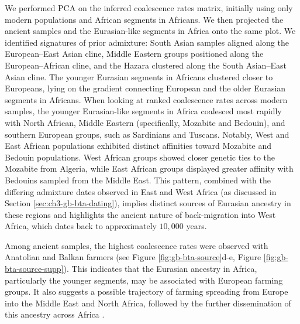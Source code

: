 
We performed PCA on the inferred coalescence rates matrix, initially using only modern populations and African segments in Africans. We then projected the ancient samples and the Eurasian-like segments in Africa onto the same plot. We identified signatures of prior admixture: South Asian samples aligned along the European–East Asian cline, Middle Eastern groups positioned along the European–African cline, and the Hazara clustered along the South Asian–East Asian cline. The younger Eurasian segments in Africans clustered closer to Europeans, lying on the gradient connecting European and the older Eurasian segments in Africans. When looking at ranked coalescence rates across modern samples, the younger Eurasian-like segments in Africa coalesced most rapidly with North African, Middle Eastern (specifically, Mozabite and Bedouin), and southern European groups, such as Sardinians and Tuscans. Notably, West and East African populations exhibited distinct affinities toward Mozabite and Bedouin populations. West African groups showed closer genetic ties to the Mozabite from Algeria, while East African groups displayed greater affinity with Bedouins sampled from the Middle East. This pattern, combined with the differing admixture dates observed in East and West Africa (as discussed in Section \ref{sec:ch3-gb-bta-dating}), implies distinct sources of Eurasian ancestry in these regions and highlights the ancient nature of back-migration into West Africa, which dates back to approximately $10{,}000$ years.

Among ancient samples, the highest coalescence rates were observed with Anatolian and Balkan farmers (see Figure \ref{fig:gb-bta-source}d-e, Figure \ref{fig:gb-bta-source-supp}). This indicates that the Eurasian ancestry in Africa, particularly the younger segments, may be associated with European farming groups. It also suggests a possible trajectory of farming spreading from Europe into the Middle East and North Africa, followed by the further dissemination of this ancestry across Africa \cite{van2018pleistocene, fregel2018ancient, simoes2023northwest}.

